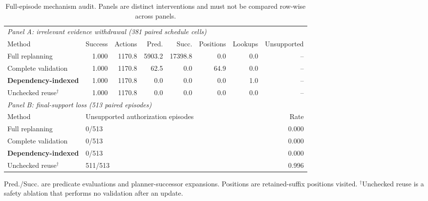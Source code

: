 \begin{table}[t]
\centering\scriptsize
\setlength{\tabcolsep}{3.0pt}
\caption{Full-episode mechanism audit. Panels are distinct interventions and must not be compared row-wise across panels.}
\label{tab:full-episode-primary}
\begin{tabular}{lrrrrrrr}
\toprule
\multicolumn{8}{l}{\textit{Panel A: irrelevant evidence withdrawal (381 paired schedule cells)}} \\
Method & Success & Actions & Pred. & Succ. & Positions & Lookups & Unsupported \\
\midrule
Full replanning & 1.000 & 1170.8 & 5903.2 & 17398.8 & 0.0 & 0.0 & -- \\
Complete validation & 1.000 & 1170.8 & 62.5 & 0.0 & 64.9 & 0.0 & -- \\
\textbf{Dependency-indexed} & 1.000 & 1170.8 & 0.0 & 0.0 & 0.0 & 1.0 & -- \\
Unchecked reuse$^{\dagger}$ & 1.000 & 1170.8 & 0.0 & 0.0 & 0.0 & 0.0 & -- \\
\midrule
\multicolumn{8}{l}{\textit{Panel B: final-support loss (513 paired episodes)}} \\
Method & \multicolumn{6}{l}{Unsupported authorization episodes} & Rate \\
\midrule
Full replanning & \multicolumn{6}{l}{0/513} & 0.000 \\
Complete validation & \multicolumn{6}{l}{0/513} & 0.000 \\
\textbf{Dependency-indexed} & \multicolumn{6}{l}{0/513} & 0.000 \\
Unchecked reuse$^{\dagger}$ & \multicolumn{6}{l}{511/513} & 0.996 \\
\bottomrule
\end{tabular}
\vspace{1mm}
\parbox{0.97\linewidth}{\scriptsize Pred./Succ. are predicate evaluations and planner-successor expansions. Positions are retained-suffix positions visited. $^{\dagger}$Unchecked reuse is a safety ablation that performs no validation after an update.}
\end{table}
